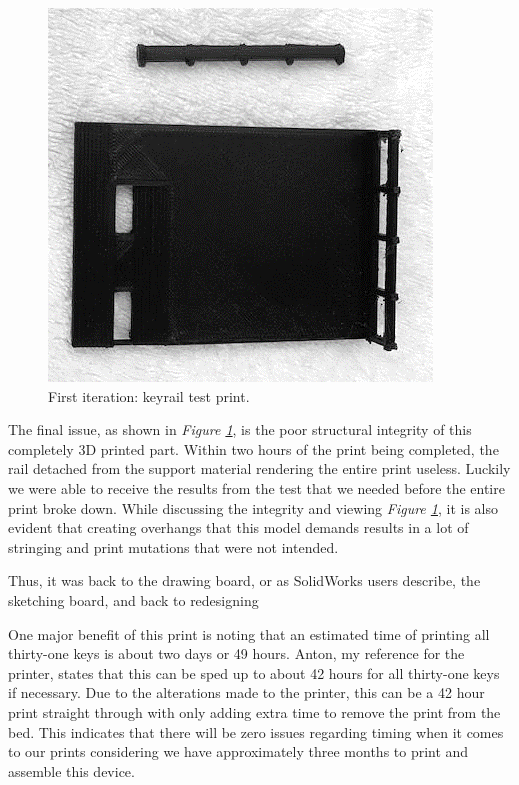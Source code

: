 \begin{figure}[h!]
  \centering
  \includegraphics[width=0.8\linewidth]{image/Print4.png}
  \caption{First iteration: keyrail test print.}
  \label{fig:print4}
\end{figure}

The final issue, as shown in \textit{Figure \ref{fig:print4}}, is the poor structural integrity of this completely 3D printed part. Within two hours of the print being completed, the rail detached from the support material rendering the entire print useless. Luckily we were able to receive the results from the test that we needed before the entire print broke down. While discussing the integrity and viewing \textit{Figure \ref{fig:print4}}, it is also evident that creating overhangs that this model demands results in a lot of stringing and print mutations that were not intended.

Thus, it was back to the drawing board, or as SolidWorks users describe, the sketching board, and back to redesigning

One major benefit of this print is noting that an estimated time of printing all thirty-one keys is about two days or 49 hours. Anton, my reference for the printer, states that this can be sped up to about 42 hours for all thirty-one keys if necessary. Due to the alterations made to the printer, this can be a 42 hour print straight through with only adding extra time to remove the print from the bed. This indicates that there will be zero issues regarding timing when it comes to our prints considering we have approximately three months to print and assemble this device.

